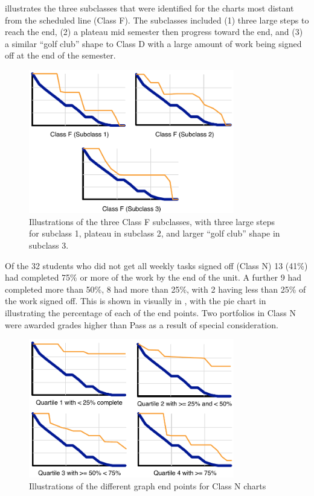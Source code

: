  illustrates the three subclasses that were identified for the charts most distant from the scheduled line (Class F). The subclasses included (1) three large steps to reach the end, (2) a plateau mid semester then progress toward the end, and (3) a similar ``golf club'' shape to Class D with a large amount of work being signed off at the end of the semester. 

\begin{figure}[htbp]
  \centering
  \includegraphics[width=0.8\textwidth]{ChartFSubclass}
  \caption{Illustrations of the three Class F subclasses, with three large steps for subclass 1, plateau in subclass 2, and larger ``golf club'' shape in subclass 3.}
  \label{fig:f_subclass}
\end{figure}

Of the 32 students who did not get all weekly tasks signed off (Class N) 13 (41\%) had completed 75\% or more of the work by the end of the unit. A further 9 had completed more than 50\%, 8 had more than 25\%, with 2 having less than 25\% of the work signed off. This is shown in visually in , with the pie chart in  illustrating the percentage of each of the end points. Two portfolios in Class N were awarded grades higher than Pass as a result of special consideration.

\begin{figure}[htbp]
  \centering
  \includegraphics[width=0.8\textwidth]{ChartNSubclass}
  \caption{Illustrations of the different graph end points for Class N charts}
  \label{fig:n_subclass}
\end{figure}

